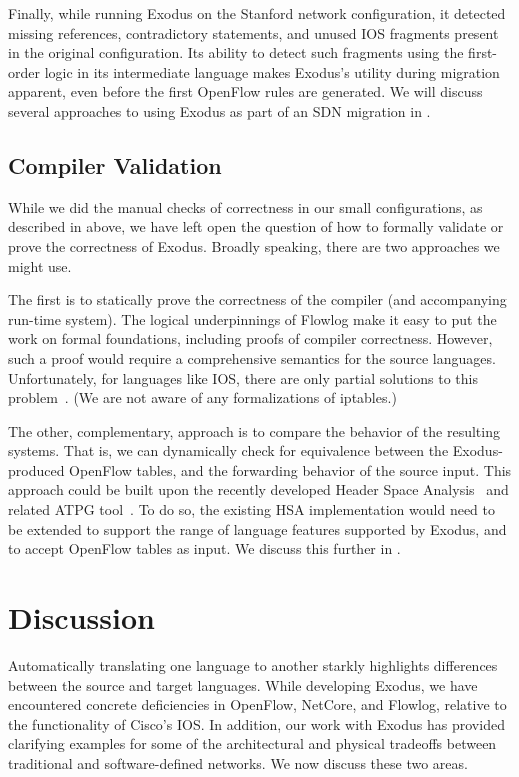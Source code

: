 Finally, while running Exodus on the Stanford network configuration, it detected
missing references, contradictory statements, and unused IOS fragments present
in the original configuration.
Its ability to detect such fragments using the first-order logic in its intermediate
language makes Exodus's utility during migration apparent, even before the first
OpenFlow rules are generated.
We will discuss several approaches to using Exodus as part of an SDN
migration in .

\subsection{Compiler Validation}

While we did the manual checks of correctness in our small configurations, 
as described in  above, we have left open the question 
of how to formally validate or prove the correctness of
Exodus. Broadly speaking, there are two approaches we might use.

The first is to statically prove the correctness of the compiler (and
accompanying run-time system). The logical underpinnings of Flowlog
make it easy to put the work on formal foundations, including proofs
of compiler correctness. However, such a proof would require a
comprehensive semantics for the source languages. Unfortunately, for
languages like IOS, there are only partial
solutions to this problem~\cite{capretta++:fmse07-firewalls,n++:lisa-margrave-firewalls,zhang++:icnp2012-firewalls}.
(We are not aware of any formalizations of
iptables.)

The other, complementary, approach is to compare the behavior of the
resulting systems. That is, we can
dynamically check for equivalence between the Exodus-produced
OpenFlow tables, and the forwarding behavior of the source input.
This approach could be built upon the recently developed Header
Space Analysis~\cite{kazemian:nsdi12-hsa} and related
ATPG tool~\cite{zeng12test}. To do so, the existing
HSA implementation would need to be extended to support the range of
language features supported by Exodus, and to accept OpenFlow tables
as input. We discuss this further in .


\section{Discussion}
\label{sec:tradeoffs}

Automatically translating one language to another starkly highlights differences
between the source and target languages.
While developing Exodus, we have encountered concrete deficiencies in OpenFlow,
NetCore, and Flowlog, relative to the functionality of Cisco's IOS.
In addition, our work with Exodus has provided clarifying examples for some of the architectural and
physical tradeoffs between traditional and software-defined networks.
We now discuss these two areas.

